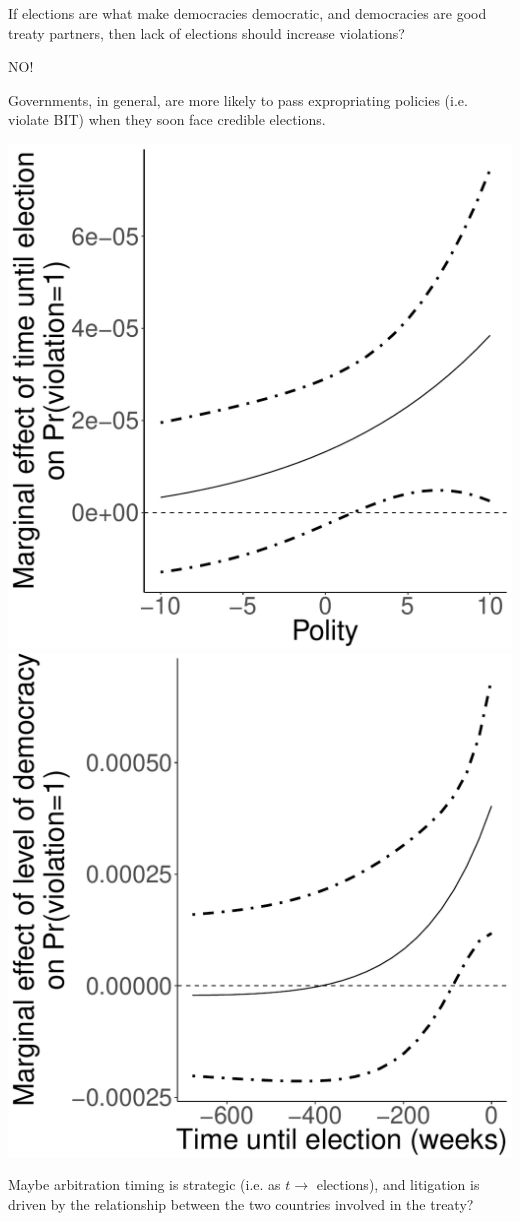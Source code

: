 \documentclass{beamer}
\begin{document}
\begin{frame}{\large If elections are what make democracies democratic, and democracies are good treaty partners, then lack of elections should increase violations?}

\begin{center}
	\pause
	{\Large NO!}
\end{center}
\end{frame}

\begin{frame}{\large Governments, in general, are more likely to pass expropriating policies (i.e. violate BIT) when they soon face credible elections.}

\includegraphics[width=.49\linewidth]{figures/polity2Effect.pdf}
\includegraphics[width=.49\linewidth]{figures/timeUntilAnyElecEffect.pdf}

\begin{center}
	\pause
	{Maybe arbitration timing is strategic (i.e. as $t \rightarrow$ elections), and litigation is driven by the relationship between the two countries involved in the treaty?}
\end{center}
\end{frame}
\end{document}
